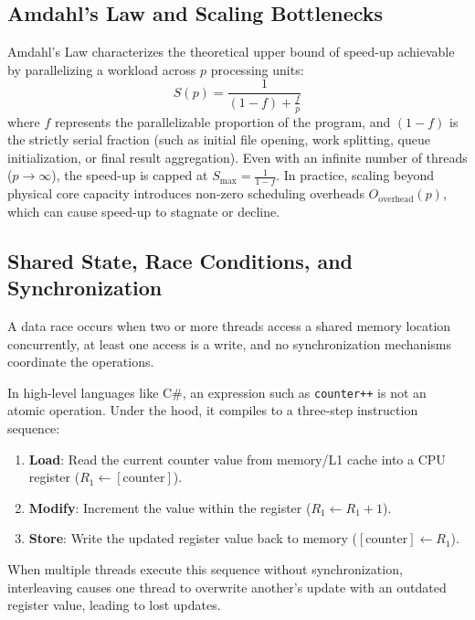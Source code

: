 \documentclass[11pt,a4paper]{article}
\begin{document}
\subsection{Amdahl's Law and Scaling Bottlenecks}
Amdahl's Law characterizes the theoretical upper bound of speed-up achievable by parallelizing a workload across $p$ processing units:
\begin{equation}
    S(p) = \frac{1}{(1 - f) + \frac{f}{p}}
\end{equation}
where $f$ represents the parallelizable proportion of the program, and $(1 - f)$ is the strictly serial fraction (such as initial file opening, work splitting, queue initialization, or final result aggregation). Even with an infinite number of threads ($p \to \infty$), the speed-up is capped at $S_{\max} = \frac{1}{1-f}$. In practice, scaling beyond physical core capacity introduces non-zero scheduling overheads $O_{\text{overhead}}(p)$, which can cause speed-up to stagnate or decline.

\subsection{Shared State, Race Conditions, and Synchronization}
A data race occurs when two or more threads access a shared memory location concurrently, at least one access is a write, and no synchronization mechanisms coordinate the operations.

In high-level languages like C\#, an expression such as \texttt{counter++} is not an atomic operation. Under the hood, it compiles to a three-step instruction sequence:
\begin{enumerate}
    \item \textbf{Load}: Read the current counter value from memory/L1 cache into a CPU register ($R_1 \leftarrow [\text{counter}]$).
    \item \textbf{Modify}: Increment the value within the register ($R_1 \leftarrow R_1 + 1$).
    \item \textbf{Store}: Write the updated register value back to memory ($[\text{counter}] \leftarrow R_1$).
\end{enumerate}
When multiple threads execute this sequence without synchronization, interleaving causes one thread to overwrite another's update with an outdated register value, leading to lost updates.
\end{document}
